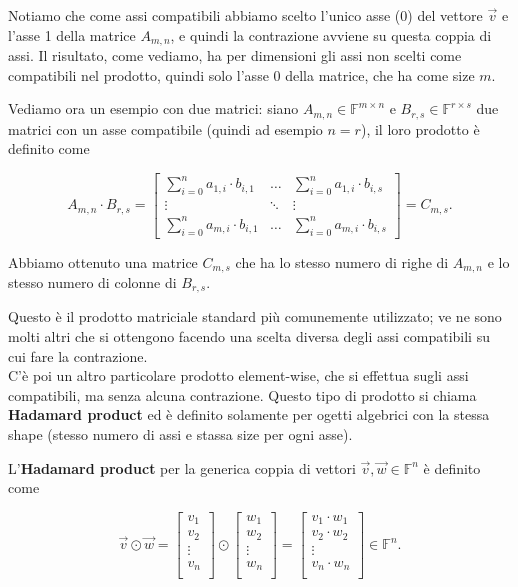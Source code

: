 Notiamo che come assi compatibili abbiamo scelto l'unico asse (0) del vettore $\vec v$ e l'asse 1 della matrice $A_{m,n}$, e quindi la contrazione avviene su questa coppia di assi.
Il risultato, come vediamo, ha per dimensioni gli assi non scelti come compatibili nel prodotto, quindi solo l'asse 0 della matrice, che ha come size $m$.

Vediamo ora un esempio con due matrici: siano $A_{m,n} \in \mathbb{F}^{m \times n}$ e $B_{r,s} \in \mathbb{F}^{r \times s}$ due matrici con un asse compatibile (quindi ad esempio $n=r$), il loro prodotto è definito come

$$
A_{m,n} \cdot B_{r,s} = \begin{bmatrix}
    \sum_{i=0}^n a_{1,i} \cdot b_{i,1} & \dots & \sum_{i=0}^n a_{1,i} \cdot b_{i,s}\\
    \vdots & \ddots & \vdots\\
    \sum_{i=0}^n a_{m,i} \cdot b_{i,1} & \dots & \sum_{i=0}^n a_{m,i} \cdot b_{i,s}
\end{bmatrix} = C_{m,s}.
$$

Abbiamo ottenuto una matrice $C_{m,s}$ che ha lo stesso numero di righe di $A_{m,n}$ e lo stesso numero di colonne di $B_{r, s}$.

Questo è il prodotto matriciale standard più comunemente utilizzato; ve ne sono molti altri che si ottengono facendo una scelta diversa degli assi compatibili su cui fare la contrazione.
\\

C'è poi un altro particolare prodotto element-wise, che si effettua sugli assi compatibili, ma senza alcuna contrazione. Questo tipo di prodotto si chiama \textbf{Hadamard product} ed è definito solamente per ogetti algebrici con la stessa shape (stesso numero di assi e stassa size per ogni asse).

L'\textbf{Hadamard product} per la generica coppia di vettori $\vec v, \vec w \in \mathbb F^n$ è definito come

$$
\vec v \odot \vec w = \begin{bmatrix}
        v_1\\
        v_2\\
        \vdots \\
        v_n \\
\end{bmatrix} \odot \begin{bmatrix}
        w_1\\
        w_2\\
        \vdots \\
        w_n \\
\end{bmatrix} = \begin{bmatrix}
        v_1 \cdot w_1\\
        v_2 \cdot w_2\\
        \vdots \\
        v_n \cdot w_n\\
\end{bmatrix} \in \mathbb F^{n}.
$$

